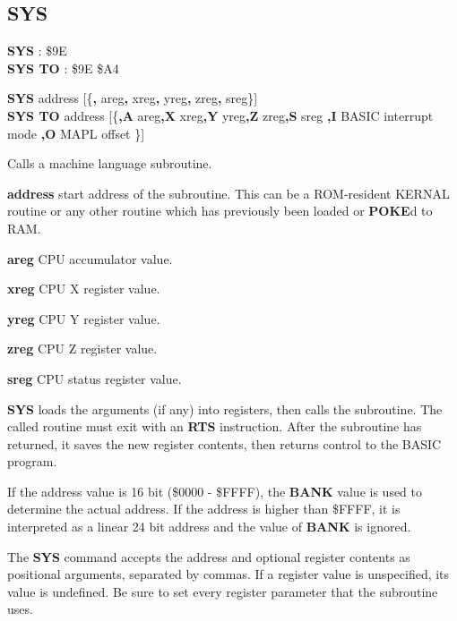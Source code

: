 
\newpage
\subsection{SYS}
\begin{description}[leftmargin=2cm,style=nextline]
\item [Token:]    {\bf SYS} : \$9E \\ {\bf SYS TO} : \$9E \$A4

\item [Format:]   {\bf SYS} address [\{{\bf,} areg{\bf,} xreg{\bf,} yreg{\bf,} zreg{\bf,} sreg\}] \\
                  {\bf SYS TO} address [\{{\bf,A} areg{\bf,X} xreg{\bf,Y} yreg{\bf,Z} zreg{\bf,S} sreg {\bf,I} BASIC interrupt mode {\bf,O} MAPL offset \}]

\item [Usage:]    Calls a machine language subroutine.

                  {\bf address} start address of the subroutine. This can be a ROM-resident KERNAL routine or any other routine which has previously been loaded or {\bf POKE}d to RAM.

                  {\bf areg} CPU accumulator value.

                  {\bf xreg} CPU X register value.

                  {\bf yreg} CPU Y register value.

                  {\bf zreg} CPU Z register value.

                  {\bf sreg} CPU status register value.

                  {\bf SYS} loads the arguments (if any) into registers, then calls the subroutine. The called routine must exit with an {\bf RTS} instruction. After the subroutine has returned, it saves the new register contents, then returns control to the BASIC program.

                  If the address value is 16 bit (\$0000 - \$FFFF), the {\bf BANK} value is used to determine the actual address. If the address is higher than \$FFFF, it is interpreted as a linear 24 bit address and the value of {\bf BANK} is ignored.

\item [SYS form:] The {\bf SYS} command accepts the address and optional register contents as positional arguments, separated by commas. If a register value is unspecified, its value is undefined. Be sure to set every register parameter that the subroutine uses.


\end{description}
